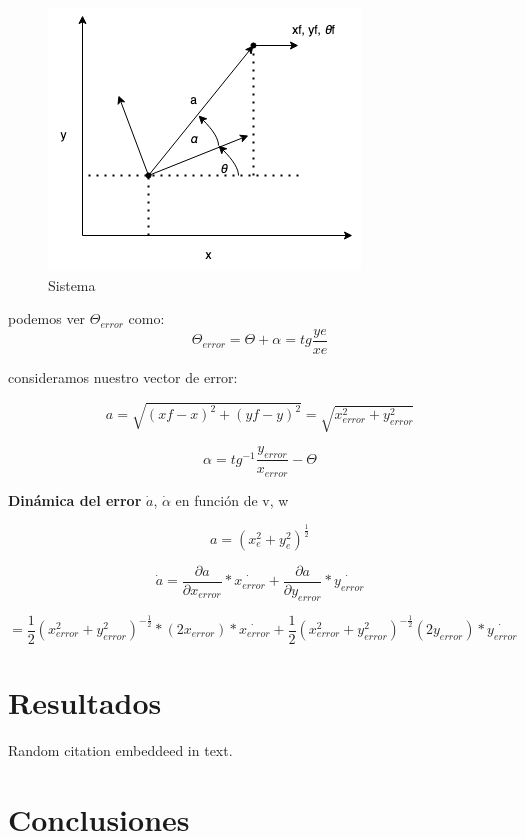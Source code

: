 \documentclass[oneside,onecolumn]{article}
\begin{document}
\begin{figure}[h]
  \centering
  \includegraphics[scale=0.7]{graficos/grafico.png}
  \caption{Sistema}
\end{figure}

podemos ver $\Theta_{error}$ como: \\
\[ \Theta_{error} = \Theta + \alpha = tg \frac{ye}{xe} \]

consideramos nuestro vector de error:

\[ a = \sqrt{(xf-x)^{2}+(yf-y)^2} = \sqrt{x_{error}^{2} + y_{error}^2} \]

\[ \alpha = tg^{-1} \frac{y_{error}}{x_{error}} - \Theta\]

\textbf{Dinámica del error} $\dot{a}$, $\dot{\alpha}$ en función de v, w

\[ a = (x_{e}^{2} + y_{e}^{2})^{\frac{1}{2}}\]

\[ \dot{a} = \frac{\partial a}{\partial x_{error}}*\dot{x_{error}} + \frac{\partial a}{\partial y_{error}}*\dot{y_{error}}\]

\[ = \frac{1}{2} (x_{error}^{2} + y_{error}^{2})^{-\frac{1}{2}}*(2x_{error})*\dot{x_{error}} + \frac{1}{2} (x_{error}^{2}+y_{error}^2)^{-\frac{1}{2}}(2y_{error})*\dot{y_{error}}\]

\section{Resultados}

Random citation \cite{einstein:1} embeddeed in text.
\section{Conclusiones}



\begin{thebibliography}{0} %

   
      
\end{thebibliography}

\end{document}

